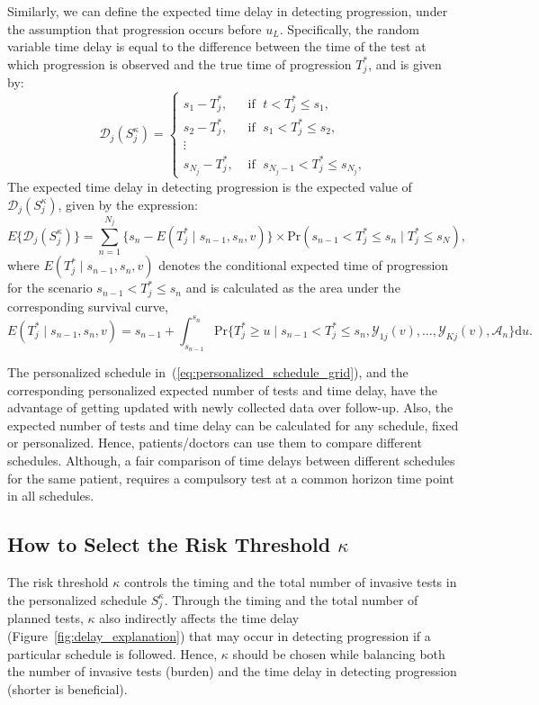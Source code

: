 Similarly, we can define the expected time delay in detecting progression, under the assumption that progression occurs before $u_L$. Specifically, the random variable time delay is equal to the difference between the time of the test at which progression is observed and the true time of progression $T_j^*$, and is given by:
\[
\mathcal D_j (S^\kappa_j) = \left \{
\begin{array}{ll}
s_1 - T_j^*, & \mbox{ if } \; t < T^*_j \leq s_1,\\
s_2 - T_j^*, & \mbox{ if } \; s_1 < T^*_j \leq s_2,\\
\vdots&\\
s_{N_j} - T_j^*, & \mbox{ if } \; s_{N_j-1} < T^*_j \leq s_{N_j},
\end{array}
\right.
\]
The expected time delay in detecting progression is the expected value of $\mathcal D_j (S^\kappa_j)$, given by the expression:
\begin{equation*}
\label{eq:exp_delay}
E \big \{ \mathcal D_j(S^\kappa_j)\big\} = \sum_{n = 1}^{N_j} \Big\{s_n - E(T^*_j \mid s_{n-1}, s_n, v)\Big\} \times \mbox{Pr}(s_{n-1} < T^*_j \leq s_n\mid T^*_j \leq s_N),
\end{equation*}
where $E(T^*_j \mid s_{n-1}, s_n, v)$ denotes the conditional expected time of progression for the scenario $s_{n-1} < T^*_j \leq s_n$ and is calculated as the area under the corresponding survival curve,
\begin{equation*}
E(T^*_j \mid s_{n-1}, s_n, v) = s_{n-1} + \int_{s_{n-1}}^{s_n} \mbox{Pr}\Big\{T^*_j \geq u \mid s_{n-1} < T^*_j \leq s_n, \mathcal{Y}_{1j}(v), \ldots, \mathcal{Y}_{Kj}(v), \mathcal{A}_n\Big\} \mathrm{d}u.
\end{equation*}

The personalized schedule in~(\ref{eq:personalized_schedule_grid}), and the corresponding personalized expected number of tests and time delay, have the advantage of getting updated with newly collected data over follow-up. Also, the expected number of tests and time delay can be calculated for any schedule, fixed or personalized. Hence, patients/doctors can use them to compare different schedules. Although, a fair comparison of time delays between different schedules for the same patient, requires a compulsory test at a common horizon time point in all schedules.

\subsection{How to Select the Risk Threshold $\kappa$}
\label{subsec:kappa_selection}
The risk threshold $\kappa$ controls the timing and the total number of invasive tests in the personalized schedule $S^\kappa_j$. Through the timing and the total number of planned tests, $\kappa$ also indirectly affects the time delay (Figure~\ref{fig:delay_explanation}) that may occur in detecting progression if a particular schedule is followed. Hence, $\kappa$ should be chosen while balancing both the number of invasive tests (burden) and the time delay in detecting progression (shorter is beneficial).

